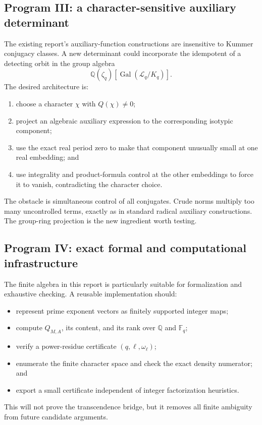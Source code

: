 \documentclass[11pt]{article}
\numberwithin{equation}{section}
\theoremstyle{definition}
\theoremstyle{remark}
\newcommand{\Q}{\mathbb Q}
\newcommand{\F}{\mathbb F}
\newcommand{\Gal}{\operatorname{Gal}}
\begin{document}
\subsection{Program III: a character-sensitive auxiliary determinant}

The existing report's auxiliary-function constructions are insensitive to Kummer conjugacy
classes.  A new determinant could incorporate the idempotent of a detecting orbit in the
group algebra
\[
 \Q(\zeta_q)[\Gal(\mathcal L_q/K_q)].
\]
The desired architecture is:
\begin{enumerate}
\item choose a character \(\chi\) with \(Q(\chi)\ne0\);
\item project an algebraic auxiliary expression to the corresponding isotypic component;
\item use the exact real period zero to make that component unusually small at one real
embedding; and
\item use integrality and product-formula control at the other embeddings to force it to
vanish, contradicting the character choice.
\end{enumerate}
The obstacle is simultaneous control of all conjugates.  Crude norms multiply too many
uncontrolled terms, exactly as in standard radical auxiliary constructions.  The group-ring
projection is the new ingredient worth testing.

\subsection{Program IV: exact formal and computational infrastructure}

The finite algebra in this report is particularly suitable for formalization and exhaustive
checking.  A reusable implementation should:
\begin{itemize}
\item represent prime exponent vectors as finitely supported integer maps;
\item compute \(Q_{M,A}\), its content, and its rank over \(\Q\) and \(\F_q\);
\item verify a power-residue certificate \((q,\ell,\omega_\ell)\);
\item enumerate the finite character space and check the exact density numerator; and
\item export a small certificate independent of integer factorization heuristics.
\end{itemize}
This will not prove the transcendence bridge, but it removes all finite ambiguity from future
candidate arguments.
\end{document}
